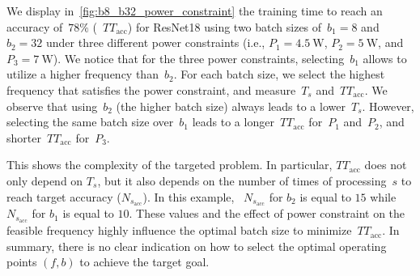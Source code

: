 We display in~\cref{fig:b8_b32_power_constraint} the training time to reach an accuracy  of~$78\%$ (~$TT_{\text{acc}}$) for ResNet18 using two batch sizes of~$b_1=8$ and~$b_2=32$ under three different power constraints (i.e., $P_1=\SI{4.5}{\watt}$, $P_2=\SI{5}{\watt}$, and $P_3=\SI{7}{\watt}$). 
We notice that for the three power constraints, selecting~$b_1$ allows to utilize a higher frequency than~$b_2$.
For each batch size, we select the highest frequency that satisfies the power constraint, and measure~$T_s$ and~$TT_{\text{acc}}$.
We observe that using~$b_2$ (the higher batch size) always leads to a lower~$T_s$. %
However, selecting the same batch size over~$b_1$ leads to a longer~$TT_{\text{acc}}$ for~$P_1$ and~$P_2$, and shorter~$TT_{\text{acc}}$ for~$P_3$. 

This shows the complexity of the targeted problem. In particular, $TT_{\text{acc}}$ does not only depend on $T_s$, but it also depends on the number of times of processing~$s$ to reach target accuracy ($N_{{s}_\text{acc}}$). In this example, ~$N_{{s}_\text{acc}}$ for $b_2$ is equal to $15$ while ~$N_{{s}_\text{acc}}$ for $b_1$ is equal to $10$. These values and the effect of power constraint on the feasible frequency highly influence the optimal batch size to minimize~$TT_{\text{acc}}$. 
In summary, there is no clear indication on how to select the optimal operating points $(f,b)$ to achieve the target goal. 

